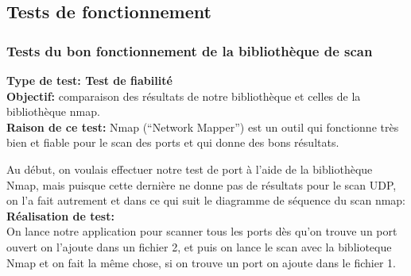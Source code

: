 \documentclass[12pt,a4paper]{article}
\begin{document}
\subsection{Tests de fonctionnement}
\subsubsection{Tests du bon fonctionnement de la bibliothèque de scan}
\textbf{Type de test: Test de fiabilité}\\
\textbf{Objectif: } comparaison des résultats de notre bibliothèque et celles de la bibliothèque nmap.\\
\textbf{Raison de ce test: }Nmap (“Network Mapper”) est un outil qui fonctionne très bien et fiable pour le scan des ports et qui donne des bons résultats.

Au début, on voulais effectuer notre test de port à l'aide de la bibliothèque Nmap, mais puisque cette dernière ne donne pas de résultats pour le scan UDP, on l'a fait autrement et dans ce qui suit le diagramme de séquence du scan nmap:\\

\textbf{Réalisation de test:}\\

On lance notre application pour scanner tous les ports dès qu'on trouve un port ouvert on l'ajoute dans un fichier 2, et puis on lance le scan avec la biblioteque Nmap et on fait la même chose, si on trouve un port on ajoute dans le fichier 1.\\
\end{document}
